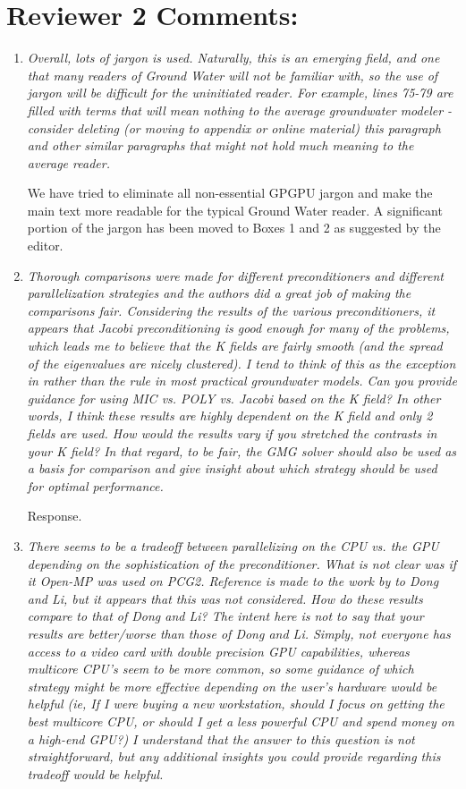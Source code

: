 \documentclass[12pt]{article} %
\begin{document}
\section*{Reviewer 2 Comments:}
\begin{enumerate}
\item \textit{Overall, lots of jargon is used. Naturally, this is an emerging field, and one that many readers of Ground Water will not be familiar with, so the use of jargon will be difficult for the uninitiated reader. For example, lines 75-79 are filled with terms that will mean nothing to the average groundwater modeler - consider deleting (or moving to appendix or online material) this paragraph and other similar paragraphs that might not hold much meaning to the average reader.} 

We have tried to eliminate all non-essential GPGPU jargon and make the main text more readable for the typical Ground Water reader.  A significant portion of the jargon has been moved to Boxes 1 and 2 as suggested by the editor.

\item \textit{Thorough comparisons were made for different preconditioners and different parallelization strategies and the authors did a great job of making the comparisons fair. Considering the results of the various preconditioners, it appears that Jacobi preconditioning is good enough for many of the problems, which leads me to believe that the K fields are fairly smooth (and the spread of the eigenvalues are nicely clustered). I tend to think of this as the exception in rather than the rule in most practical groundwater models. Can you provide guidance for using MIC vs. POLY vs. Jacobi based on the K field? In other words, I think these results are highly dependent on the K field and only 2 fields are used. How would the results vary if you stretched the contrasts in your K field? In that regard, to be fair, the GMG solver should also be used as a basis for comparison and give insight about which strategy should be used for optimal performance.} 

Response. 

\item \textit{There seems to be a tradeoff between parallelizing on the CPU vs. the GPU depending on the sophistication of the preconditioner. What is not clear was if it Open-MP was used on PCG2. Reference is made to the work by to Dong and Li, but it appears that this was not considered. How do these results compare to that of Dong and Li? The intent here is not to say that your results are better/worse than those of Dong and Li. Simply, not everyone has access to a video card with double precision GPU capabilities, whereas multicore CPU's seem to be more common, so some guidance of which strategy might be more effective depending on the user's hardware would be helpful (ie, If I were buying a new workstation, should I focus on getting the best multicore CPU, or should I get a less powerful CPU and spend money on a high-end GPU?) I understand that the answer to this question is not straightforward, but any additional insights you could provide regarding this tradeoff would be helpful.} 


\end{enumerate}
\end{document}
